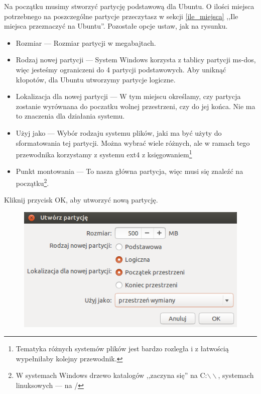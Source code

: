 Na początku musimy stworzyć partycję podstawową dla Ubuntu. O ilości miejsca potrzebnego na poszczególne partycje przeczytasz w sekcji \ref{ile_miejsca} ,,Ile miejsca przeznaczyć na Ubuntu''. Pozostałe opcje ustaw, jak na rysunku.
\begin{itemize}
\item \textcolor{ubuntu_orange}{Rozmiar} --- Rozmiar partycji w megabajtach.
\item \textcolor{ubuntu_orange}{Rodzaj nowej partycji} --- System Windows korzysta z tablicy partycji ms-dos, więc jesteśmy ograniczeni do 4 partycji podstawowych. Aby uniknąć kłopotów, dla Ubuntu utworzymy partycje logiczne.
\item \textcolor{ubuntu_orange}{Lokalizacja dla nowej partycji} --- W tym miejscu określamy, czy partycja zostanie wyrównana do poczatku wolnej przestrzeni, czy do jej końca. Nie ma to znaczenia dla działania systemu.
\item \textcolor{ubuntu_orange}{Użyj jako} --- Wybór rodzaju systemu plików, jaki ma być użyty do sformatowania tej partycji. Można wybrać wiele różnych, ale w ramach tego przewodnika korzystamy z systemu ext4 z księgowaniem\footnote{Tematyka różnych systemów plików jest bardzo rozległa i z łatwością wypełniłaby kolejny przewodnik.}
\item \textcolor{ubuntu_orange}{Punkt montowania} --- To nasza główna partycja, więc musi się znaleźć na początku\footnote{W systemach Windows drzewo katalogów ,,zaczyna się'' na C:$\backslash\backslash$,  systemach linuksowych --- na /}.
\end{itemize}
Kliknij przycisk \textcolor{ubuntu_orange}{OK}, aby utworzyć nową partycję.
\clearpage
\begin{figure}
                \includegraphics[width=\linewidth]{images/instalator_partycjonowanie_gparted_dodaj_swap.png}
\end{figure}
